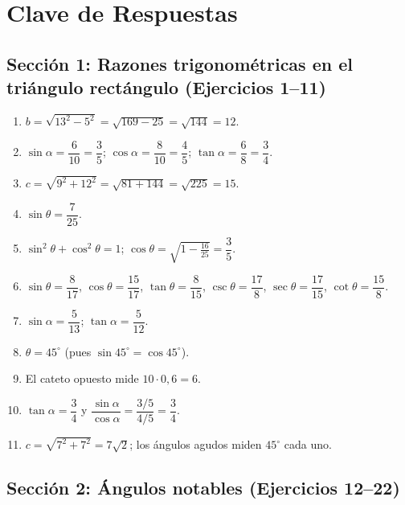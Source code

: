 \documentclass[12pt, letterpaper]{article}
\providecommand{\sen}{\sin}
\begin{document}
\newpage

\ifmwclaves
  \section{Clave de Respuestas}

  \subsection*{Sección 1: Razones trigonométricas en el triángulo rectángulo (Ejercicios 1--11)}

  \begin{enumerate}[leftmargin=*, label=\textbf{\arabic*.}]
    \setcounter{enumi}{0}
    \item $b = \sqrt{13^2 - 5^2} = \sqrt{169 - 25} = \sqrt{144} = 12$.
    \item $\sen \alpha = \dfrac{6}{10} = \dfrac{3}{5}$; $\cos \alpha = \dfrac{8}{10} = \dfrac{4}{5}$; $\tan \alpha = \dfrac{6}{8} = \dfrac{3}{4}$.
    \item $c = \sqrt{9^2 + 12^2} = \sqrt{81 + 144} = \sqrt{225} = 15$.
    \item $\sen \theta = \dfrac{7}{25}$.
    \item $\sen^2 \theta + \cos^2 \theta = 1$; $\cos \theta = \sqrt{1 - \frac{16}{25}} = \dfrac{3}{5}$.
    \item $\sen \theta = \dfrac{8}{17}$, $\cos \theta = \dfrac{15}{17}$, $\tan \theta = \dfrac{8}{15}$, $\csc \theta = \dfrac{17}{8}$, $\sec \theta = \dfrac{17}{15}$, $\cot \theta = \dfrac{15}{8}$.
    \item $\sen \alpha = \dfrac{5}{13}$; $\tan \alpha = \dfrac{5}{12}$.
    \item $\theta = 45^{\circ}$ (pues $\sen 45^{\circ} = \cos 45^{\circ}$).
    \item El cateto opuesto mide $10 \cdot 0{,}6 = 6$.
    \item $\tan \alpha = \dfrac{3}{4}$ y $\dfrac{\sen \alpha}{\cos \alpha} = \dfrac{3/5}{4/5} = \dfrac{3}{4}$. \checkmark
    \item $c = \sqrt{7^2 + 7^2} = 7\sqrt{2}$; los ángulos agudos miden $45^{\circ}$ cada uno.
  \end{enumerate}

  \subsection*{Sección 2: Ángulos notables (Ejercicios 12--22)}
\end{document}
